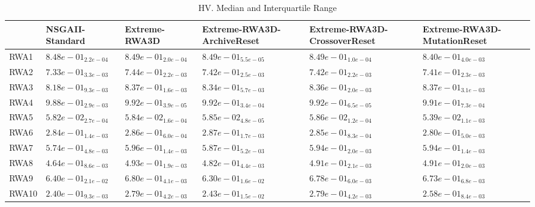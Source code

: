 \documentclass{article}
\begin{document}
\begin{table}
\caption{HV. Median and Interquartile Range}
\label{table: HV}
\centering
\begin{scriptsize}
\begin{tabular}{llllll}
\hline & NSGAII-Standard & Extreme-RWA3D & Extreme-RWA3D-ArchiveReset & Extreme-RWA3D-CrossoverReset &  Extreme-RWA3D-MutationReset\\
\hline 
RWA1 & $  8.48e-01_{ 2.2e-04}$ & $  8.49e-01_{ 2.0e-04}$ & \cellcolor{gray95}$  8.49e-01_{ 5.5e-05}$ & \cellcolor{gray25}$  8.49e-01_{ 1.0e-04}$ & $  8.40e-01_{ 4.0e-03}$ \\
RWA2 & $  7.33e-01_{ 3.3e-03}$ & \cellcolor{gray95}$  7.44e-01_{ 2.2e-03}$ & \cellcolor{gray25}$  7.42e-01_{ 2.5e-03}$ & $  7.42e-01_{ 2.2e-03}$ & $  7.41e-01_{ 2.3e-03}$ \\
RWA3 & $  8.18e-01_{ 9.3e-03}$ & \cellcolor{gray95}$  8.37e-01_{ 1.6e-03}$ & $  8.34e-01_{ 5.7e-03}$ & $  8.36e-01_{ 2.0e-03}$ & \cellcolor{gray25}$  8.37e-01_{ 3.1e-03}$ \\
RWA4 & $  9.88e-01_{ 2.9e-03}$ & \cellcolor{gray95}$  9.92e-01_{ 3.9e-05}$ & $  9.92e-01_{ 3.4e-04}$ & \cellcolor{gray25}$  9.92e-01_{ 6.5e-05}$ & $  9.91e-01_{ 7.3e-04}$ \\
RWA5 & $  5.82e-02_{ 2.7e-04}$ & $  5.84e-02_{ 1.6e-04}$ & \cellcolor{gray25}$  5.85e-02_{ 4.8e-05}$ & \cellcolor{gray95}$  5.86e-02_{ 1.2e-04}$ & $  5.39e-02_{ 1.1e-03}$ \\
RWA6 & $  2.84e-01_{ 1.4e-03}$ & \cellcolor{gray25}$  2.86e-01_{ 6.0e-04}$ & \cellcolor{gray95}$  2.87e-01_{ 1.7e-03}$ & $  2.85e-01_{ 8.3e-04}$ & $  2.80e-01_{ 5.0e-03}$ \\
RWA7 & $  5.74e-01_{ 4.8e-03}$ & \cellcolor{gray95}$  5.96e-01_{ 1.4e-03}$ & $  5.87e-01_{ 5.2e-03}$ & $  5.94e-01_{ 2.0e-03}$ & \cellcolor{gray25}$  5.94e-01_{ 1.4e-03}$ \\
RWA8 & $  4.64e-01_{ 8.6e-03}$ & \cellcolor{gray95}$  4.93e-01_{ 1.9e-03}$ & $  4.82e-01_{ 4.4e-03}$ & \cellcolor{gray25}$  4.91e-01_{ 2.1e-03}$ & $  4.91e-01_{ 2.0e-03}$ \\
RWA9 & $  6.40e-01_{ 2.1e-02}$ & \cellcolor{gray95}$  6.80e-01_{ 4.1e-03}$ & $  6.30e-01_{ 1.6e-02}$ & \cellcolor{gray25}$  6.78e-01_{ 6.0e-03}$ & $  6.73e-01_{ 6.8e-03}$ \\
RWA10 & $  2.40e-01_{ 9.3e-03}$ & \cellcolor{gray95}$  2.79e-01_{ 4.2e-03}$ & $  2.43e-01_{ 1.5e-02}$ & \cellcolor{gray25}$  2.79e-01_{ 4.2e-03}$ & $  2.58e-01_{ 8.4e-03}$ \\
\hline
\end{tabular}
\end{scriptsize}
\end{table}
\end{document}
